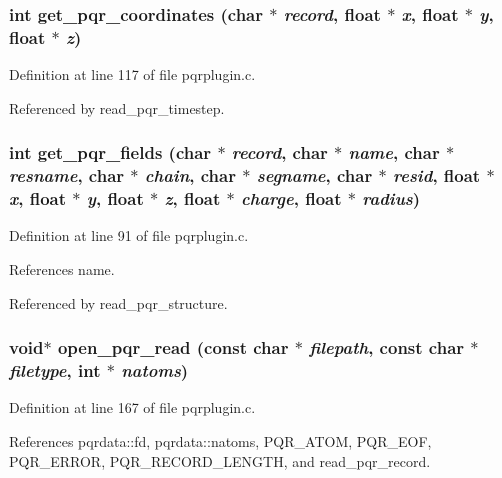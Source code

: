 \subsubsection{\setlength{\rightskip}{0pt plus 5cm}int get\_\-pqr\_\-coordinates (char $\ast$ {\em record}, float $\ast$ {\em x}, float $\ast$ {\em y}, float $\ast$ {\em z})\hspace{0.3cm}{\tt  [static]}}\label{pqrplugin_8c_a9}




Definition at line 117 of file pqrplugin.c.

Referenced by read\_\-pqr\_\-timestep.
\subsubsection{\setlength{\rightskip}{0pt plus 5cm}int get\_\-pqr\_\-fields (char $\ast$ {\em record}, char $\ast$ {\em name}, char $\ast$ {\em resname}, char $\ast$ {\em chain}, char $\ast$ {\em segname}, char $\ast$ {\em resid}, float $\ast$ {\em x}, float $\ast$ {\em y}, float $\ast$ {\em z}, float $\ast$ {\em charge}, float $\ast$ {\em radius})\hspace{0.3cm}{\tt  [static]}}\label{pqrplugin_8c_a8}




Definition at line 91 of file pqrplugin.c.

References name.

Referenced by read\_\-pqr\_\-structure.
\subsubsection{\setlength{\rightskip}{0pt plus 5cm}void$\ast$ open\_\-pqr\_\-read (const char $\ast$ {\em filepath}, const char $\ast$ {\em filetype}, int $\ast$ {\em natoms})\hspace{0.3cm}{\tt  [static]}}\label{pqrplugin_8c_a12}




Definition at line 167 of file pqrplugin.c.

References pqrdata::fd, pqrdata::natoms, PQR\_\-ATOM, PQR\_\-EOF, PQR\_\-ERROR, PQR\_\-RECORD\_\-LENGTH, and read\_\-pqr\_\-record.
